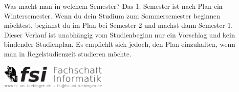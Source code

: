\begin{block}{Was macht man in welchem Semester?}
	Das 1. Semester ist nach Plan ein Wintersemester. Wenn du dein Studium zum Sommersemester beginnen möchtest, beginnst du im Plan bei Semester 2 und machst dann Semester 1. 
Dieser Verlauf ist unabhängig vom Studienbeginn nur ein Vorschlag und kein bindender Studienplan. Es empfiehlt sich jedoch, den Plan einzuhalten, wenn man in Regelstudienzeit studieren möchte.
\end{block}

\vfill
\begin{flushright}
	\includegraphics[width=0.4\textwidth]{images/fsilogo.pdf}
\end{flushright}
